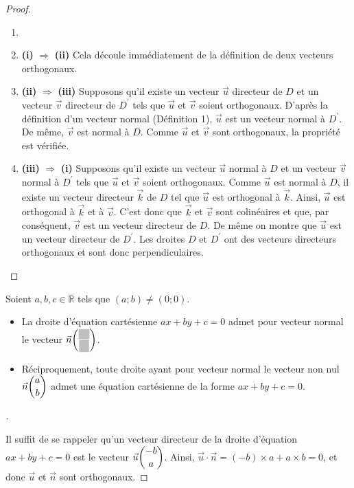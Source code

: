 \documentclass[12pt]{article}
\theoremstyle{break}
\newenvironment{demo}[1][\proofname]{%
  \begin{proof}[#1]$ $\newline
  }{%
  \end{proof}
}
\begin{document}
\begin{proof}
  \begin{enumerate}
    \itemindent=-15pt
    \item[]
    \item[]\textbf{(i)} $\Longrightarrow$ \textbf{(ii)} Cela découle immédiatement de la définition de deux vecteurs orthogonaux.
    \item[]\textbf{(ii)} $\Longrightarrow$ \textbf{(iii)} Supposons qu'il existe un vecteur $\vec{u}$ directeur de $D$ et un vecteur $\vec{v}$ directeur de $D^{\prime}$ tels que $\vec{u}$ et $\vec{v}$ soient orthogonaux. D'après la définition d'un vecteur normal (Définition 1), $\vec{u}$ est un vecteur normal à $D^{\prime}$. De même, $\vec{v}$ est normal à $D$. Comme $\vec{u}$ et $\vec{v}$ sont orthogonaux, la propriété est vérifiée.
    \item[]\textbf{(iii)} $\Longrightarrow$ \textbf{(i)} Supposons qu'il existe un vecteur $\vec{u}$ normal à $D$ et un vecteur $\vec{v}$ normal à $D^{\prime}$ tels que $\vec{u}$ et $\vec{v}$ soient orthogonaux. Comme $\vec{u}$ est normal à $D$, il existe un vecteur directeur $\vec{k}$ de $D$ tel que $\vec{u}$ est orthogonal à $\vec{k}$. Ainsi, $\vec{u}$ est orthogonal à $\vec{k}$ et à $\vec{v}$. C'est donc que $\vec{k}$ et $\vec{v}$ sont colinéaires et que, par conséquent, $\vec{v}$ est un vecteur directeur de $D$. De même on montre que $\vec{u}$ est un vecteur directeur de $D^{\prime}$. Les droites $D$ et $D^{\prime}$ ont des vecteurs directeurs orthogonaux et sont donc perpendiculaires.
  \end{enumerate}
\end{proof}

\begin{proposition}{}{}
  Soient $a, b, c \in \mathbb{R}$ tels que $(a ; b) \neq(0 ; 0)$.

  \begin{itemize}
    \item La droite d'équation cartésienne $a x+b y+c=0$ admet pour vecteur normal le vecteur $\vec{n}\dbinom{\hideM{a}}{\hideM{b}}$.
    \item Réciproquement, toute droite ayant pour vecteur normal le vecteur non nul $\vec{n}\dbinom{a}{b}$ admet une équation cartésienne de la forme $a x+b y+c=0$.
  \end{itemize}
\end{proposition}

\begin{demo}
  Il suffit de se rappeler qu'un vecteur directeur de la droite d'équation $a x+b y+c=0$ est le vecteur $\vec{u}\dbinom{-b}{a}$. Ainsi, $\vec{u} \cdot \vec{n}=(-b) \times a+a \times b=0$, et donc $\vec{u}$ et $\vec{n}$ sont orthogonaux.
\end{demo}
\end{document}

